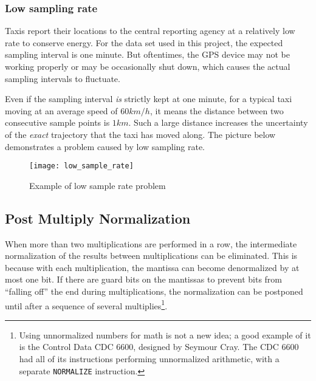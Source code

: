 \subsubsection{Low sampling rate}
Taxis report their locations to the central reporting agency at a relatively low rate to conserve energy. For the data set used in this project, the expected sampling interval is one minute. But oftentimes, the GPS device may not be working properly or may be occasionally shut down, which causes the actual sampling intervals to fluctuate. 

Even if the sampling interval \emph{is} strictly kept at one minute, for a typical taxi moving at an average speed of $60km/h$, it means the distance between two consecutive sample points is $1km$. Such a large distance increases the uncertainty of the \emph{exact} trajectory that the taxi has moved along. The picture\cite{TDR10} below demonstrates a problem caused by low sampling rate.
\begin{figure}[h]
\texttt{[image: low\_sample\_rate]}
\centering
\caption{Example of low sample rate problem}
\end{figure}

\subsection{Post Multiply Normalization}

When more than two multiplications are performed in a row, the intermediate
normalization of the results between multiplications can be eliminated.
This is because with each multiplication, the mantissa can become
denormalized by at most one bit.  If there are guard bits on the mantissas
to prevent bits from ``falling off'' the end during multiplications, the
normalization can be postponed until after a sequence of several
multiplies\footnote{Using unnormalized numbers for math is not a new idea; a
good example of it is the Control Data CDC 6600, designed by Seymour Cray.
\cite{thornton:cdc6600} The CDC 6600 had all of its instructions performing
unnormalized arithmetic, with a separate {\tt NORMALIZE} instruction.}.

%

